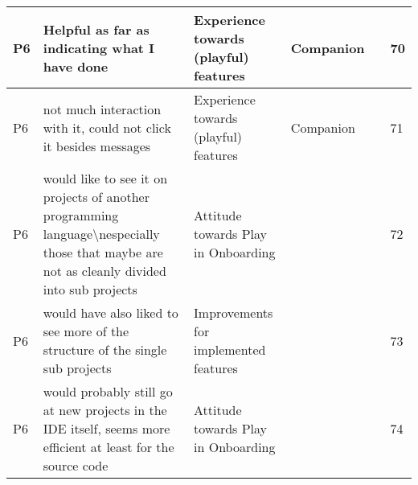 \begin{appendices}
\begin{landscape}
\begin{longtable}{|p{0.8cm}|p{7cm}|p{3cm}|p{3cm}|p{5.5cm}|p{0.5cm}|}
      P6                   & Helpful as far as indicating what I have done                                                                                                                                                                                                                               & Experience towards (playful) features    & Companion                          &                                                                                                                                                    & 70           \\ \hline
      P6                   & not much interaction with it, could not click it besides messages                                                                                                                                                                                                           & Experience towards (playful) features    & Companion                          &                                                                                                                                                    & 71           \\ \hline
      P6                   & would like to see it on projects of another programming language\textbackslash{}nespecially those that maybe are not as cleanly divided into sub projects                                                                                                                   & Attitude towards Play in Onboarding      &                                    &                                                                                                                                                    & 72           \\ \hline
      P6                   & would have also liked to see more of the structure of the single sub projects                                                                                                                                                                                               & Improvements for implemented features    &                                    &                                                                                                                                                    & 73           \\ \hline
      P6                   & would probably still go at new projects in the IDE itself, seems more efficient at least for the source code                                                                                                                                                                & Attitude towards Play in Onboarding      &                                    &                                                                                                                                                    & 74           \\ \hline

\end{longtable}
\end{landscape}
\end{appendices}
